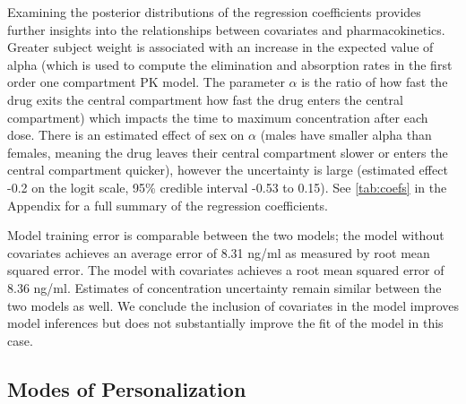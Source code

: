 Examining the posterior distributions of the regression coefficients provides further insights into the relationships between covariates and pharmacokinetics. Greater subject weight is associated with an increase in the expected value of alpha (which is used to compute the elimination and absorption rates in the first order one compartment PK model.  The parameter $ \alpha $ is the ratio of how fast the drug exits the central compartment  how fast the drug enters the central compartment) which impacts the time to maximum concentration after each dose.  There is an estimated effect of sex on $ \alpha $ (males have smaller alpha than females, meaning the drug leaves their central compartment slower or enters the central compartment quicker), however the uncertainty is large (estimated effect -0.2 on the logit scale, 95\% credible interval -0.53 to 0.15). See \cref{tab:coefs} in the Appendix for a full summary of the regression coefficients.




Model training error is comparable between the two models; the model without covariates achieves an average error of 8.31 ng/ml as measured by root mean squared error.  The model with covariates achieves a root mean squared error of 8.36  ng/ml.  Estimates of concentration uncertainty remain similar between the two models as well.  We conclude the inclusion of covariates in the model improves model inferences but does not substantially improve the fit of the model in this case.



\subsection{Modes of Personalization}



